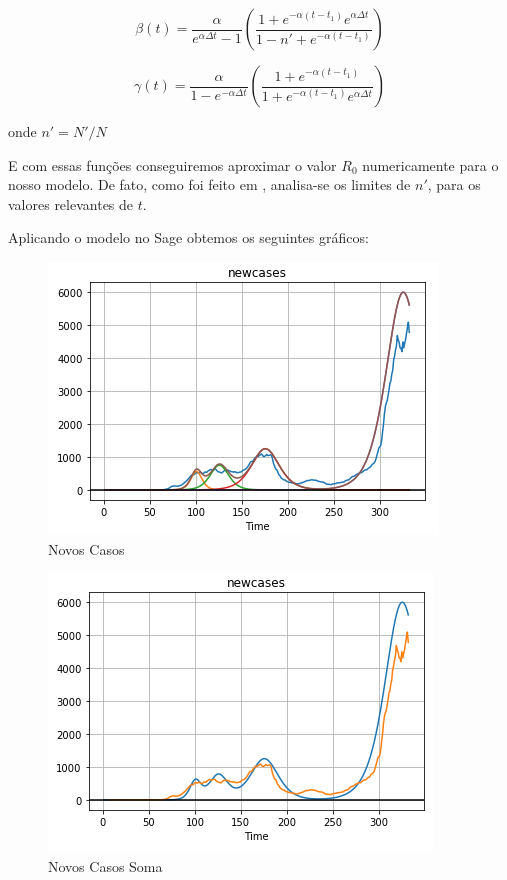 \documentclass{article}
\begin{document}
$$\beta(t) = \frac{\alpha}{e^{\alpha\Delta t}-1}\left(\frac{1+e^{-\alpha(t-t_1)}e^{\alpha \Delta t}}{1-n'+e^{-\alpha(t-t_1)}}\right)$$

$$\gamma(t) = \frac{\alpha}{1-e^{-\alpha\Delta t}}\left(\frac{1+e^{-\alpha(t-t_1)}}{1+e^{-\alpha(t-t_1)}e^{\alpha \Delta t}}\right)$$

onde $n'=N'/N$

E com essas funções conseguiremos aproximar o valor $R_0$ numericamente para o nosso modelo. De fato, como foi feito em \citep{thefirst100days}, analisa-se os limites de $n'$, para os valores relevantes de $t$.

Aplicando o modelo no Sage obtemos os seguintes gráficos:

\begin{figure}[H]
    \centering
    \includegraphics[width=0.8\linewidth]{grafico1.png}
    \caption{Novos Casos}
    \label{fig:grafico1}
\end{figure}

\begin{figure}[H]
    \centering
    \includegraphics[width=0.8\linewidth]{grafico2.png}
    \caption{Novos Casos Soma}
    \label{fig:grafico2}
\end{figure}
\end{document}
